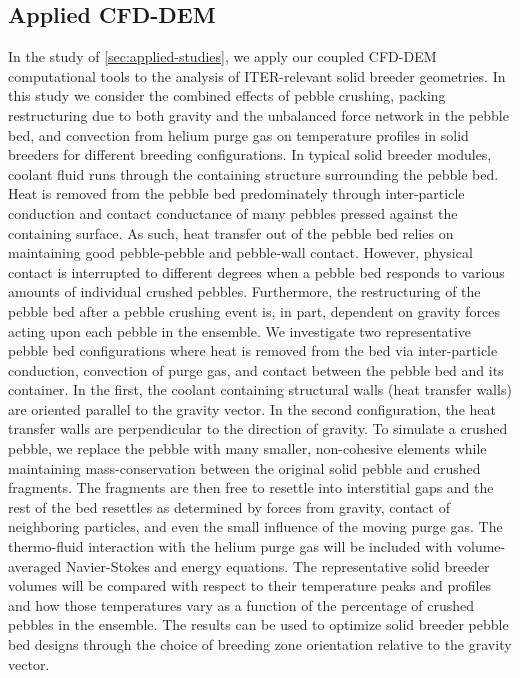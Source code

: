 \subsection*{Applied CFD-DEM}
In the study of \cref{sec:applied-studies}, we apply our coupled CFD-DEM computational tools to the analysis of ITER-relevant solid breeder geometries. In this study we consider the combined effects of pebble crushing, packing restructuring due to both gravity and the unbalanced force network in the pebble bed, and convection from helium purge gas on temperature profiles in solid breeders for different breeding configurations. In typical solid breeder modules, coolant fluid runs through the containing structure surrounding the pebble bed. Heat is removed from the pebble bed predominately through inter-particle conduction and contact conductance of many pebbles pressed against the containing surface. As such, heat transfer out of the pebble bed relies on maintaining good pebble-pebble and pebble-wall contact. However, physical contact is interrupted to different degrees when a pebble bed responds to various amounts of individual crushed pebbles. Furthermore, the restructuring of the pebble bed after a pebble crushing event is, in part, dependent on gravity forces acting upon each pebble in the ensemble. We investigate two representative pebble bed configurations where heat is removed from the bed via inter-particle conduction, convection of purge gas, and contact between the pebble bed and its container. In the first, the coolant containing structural walls (heat transfer walls) are oriented parallel to the gravity vector. In the second configuration, the heat transfer walls are perpendicular to the direction of gravity. To simulate a crushed pebble, we replace the pebble with many smaller, non-cohesive elements while maintaining mass-conservation between the original solid pebble and crushed fragments. The fragments are then free to resettle into interstitial gaps and the rest of the bed resettles as determined by forces from gravity, contact of neighboring particles, and even the small influence of the moving purge gas. The thermo-fluid interaction with the helium purge gas will be included with volume-averaged Navier-Stokes and energy equations. The representative solid breeder volumes will be compared with respect to their temperature peaks and profiles and how those temperatures vary as a function of the percentage of crushed pebbles in the ensemble. The results can be used to optimize solid breeder pebble bed designs through the choice of breeding zone orientation relative to the gravity vector.


